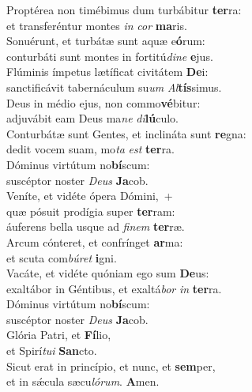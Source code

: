 \evenverse Proptérea non timébimus dum turbábitur \textbf{ter}ra:~\*\\
\evenverse et transferéntur montes \textit{in} \textit{cor} \textbf{ma}ris.\\
\oddverse Sonuérunt, et turbátæ sunt aquæ e\textbf{ó}rum:~\*\\
\oddverse conturbáti sunt montes in fortitú\textit{di}\textit{ne} \textbf{e}jus.\\
\evenverse Flúminis ímpetus lætíficat civitátem \textbf{De}i:~\*\\
\evenverse sanctificávit tabernáculum su\textit{um} \textit{Al}\textbf{tís}simus.\\
\oddverse Deus in médio ejus, non commo\textbf{vé}bitur:~\*\\
\oddverse adjuvábit eam Deus ma\textit{ne} \textit{di}\textbf{lú}culo.\\
\evenverse Conturbátæ sunt Gentes, et inclináta sunt \textbf{re}gna:~\*\\
\evenverse dedit vocem suam, mo\textit{ta} \textit{est} \textbf{ter}ra.\\
\oddverse Dóminus virtútum no\textbf{bí}scum:~\*\\
\oddverse suscéptor noster \textit{De}\textit{us} \textbf{Ja}cob.\\
\evenverse Veníte, et vidéte ópera Dómini,~+\\
\evenverse  quæ pósuit prodígia super \textbf{ter}ram:~\*\\
\evenverse áuferens bella usque ad \textit{fi}\textit{nem} \textbf{ter}ræ.\\
\oddverse Arcum cónteret, et confrínget \textbf{ar}ma:~\*\\
\oddverse et scuta com\textit{bú}\textit{ret} \textbf{i}gni.\\
\evenverse Vacáte, et vidéte quóniam ego sum \textbf{De}us:~\*\\
\evenverse exaltábor in Géntibus, et exaltá\textit{bor} \textit{in} \textbf{ter}ra.\\
\oddverse Dóminus virtútum no\textbf{bí}scum:~\*\\
\oddverse suscéptor noster \textit{De}\textit{us} \textbf{Ja}cob.\\
\evenverse Glória Patri, et \textbf{Fí}lio,~\*\\
\evenverse et Spirí\textit{tu}\textit{i} \textbf{San}cto.\\
\oddverse Sicut erat in princípio, et nunc, et \textbf{sem}per,~\*\\
\oddverse et in sǽcula sæcu\textit{ló}\textit{rum}. \textbf{A}men.\\

